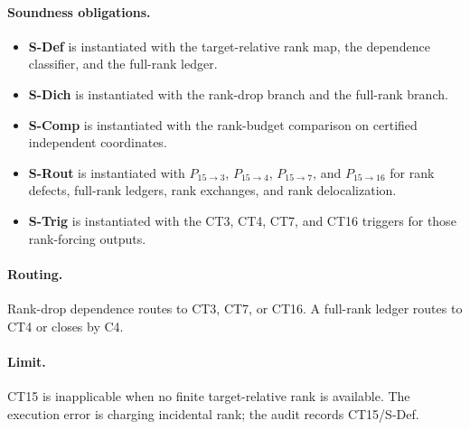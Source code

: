 \documentclass[
  11pt,
]{article}
\providecommand{\tightlist}{%
  \setlength{\itemsep}{0pt}\setlength{\parskip}{0pt}}
\theoremstyle{definition}
\newcommand{\ctpar}[1]{\paragraph{#1.}}
\begin{document}
\ctpar{Soundness obligations}
\begin{itemize}
\tightlist
\item \textbf{S-Def} is instantiated with the target-relative rank map, the dependence classifier, and the full-rank ledger.
\item \textbf{S-Dich} is instantiated with the rank-drop branch and the full-rank branch.
\item \textbf{S-Comp} is instantiated with the rank-budget comparison on certified independent coordinates.
\item \textbf{S-Rout} is instantiated with \(P_{15\to3}\), \(P_{15\to4}\), \(P_{15\to7}\), and \(P_{15\to16}\) for rank defects, full-rank ledgers, rank exchanges, and rank delocalization.
\item \textbf{S-Trig} is instantiated with the CT3, CT4, CT7, and CT16 triggers for those rank-forcing outputs.
\end{itemize}

\ctpar{Routing}
Rank-drop dependence routes to CT3, CT7, or CT16.  A full-rank ledger
routes to CT4 or closes by C4.

\ctpar{Limit}
CT15 is inapplicable when no finite target-relative rank is available. The
execution error is charging incidental rank; the audit records
CT15/S-Def.
\end{document}
